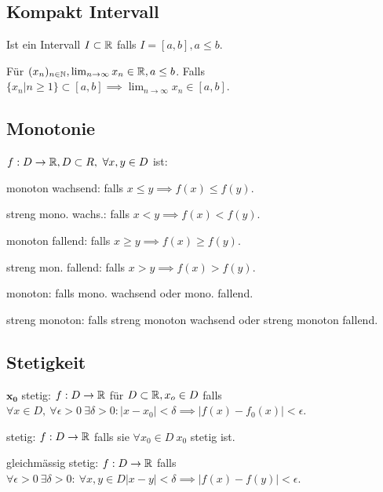 \subsection{Kompakt Intervall}
Ist ein Intervall $I \subset \mathbb{R}$ falls $I = [a, b], a \le b$.
\begin{compactitem}
    \item Für $(x_n)_{n \in \mathbb{N}}, \lim_{n \to \infty}x_n \in \mathbb{R}, a \le b$. Falls $\{x_n | n \ge 1\} \subset [a, b] \implies \lim_{n \to \infty}x_n \in [a, b]$.
\end{compactitem}

\subsection{Monotonie}
$f : D \to \mathbb{R}, D \subset R, \ \forall x,y \in D$ ist:
\begin{compactdesc}
    \item[monoton wachsend:] falls $x \le y \implies f(x) \le f(y)$.
    \item[streng mono. wachs.:] falls $x < y \implies f(x) < f(y)$.
    \item[monoton fallend:] falls $x \ge y \implies f(x) \ge f(y)$.
    \item[streng mon. fallend:] falls $x > y \implies f(x) > f(y)$.
    \item[monoton:] falls mono. wachsend oder mono. fallend.
    \item[streng monoton:] falls streng monoton wachsend oder streng monoton fallend.
\end{compactdesc}

\subsection{Stetigkeit}
\begin{compactdesc}
    \item[$\mathbf{x_0}$ stetig:] $f: D \to \mathbb{R}$ für $D \subset \mathbb{R}, x_o \in D$  falls  $\forall x \in D, \ \forall \epsilon > 0 \ \exists \delta > 0: \left| x - x_0 \right| < \delta \implies \left| f(x) - f_0(x) \right| < \epsilon$.
    \item[stetig:] $f: D \to \mathbb{R}$ falls sie $\forall x_0 \in D\ x_0$ stetig ist.
    \item[gleichmässig stetig:] $f:D \to \mathbb{R}$ falls $\forall \epsilon > 0 \ \exists \delta > 0: \ \forall x, y \in D \left| x -y \right| < \delta \implies \left| f(x) - f(y) \right| < \epsilon$.
\end{compactdesc}

